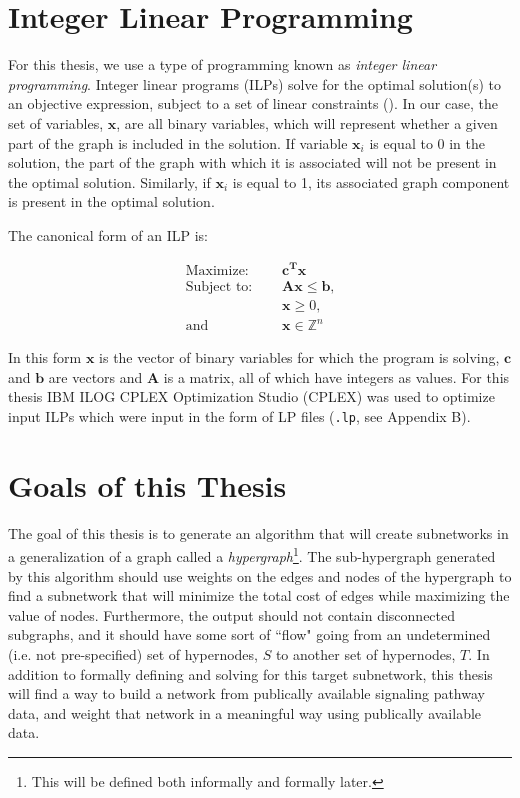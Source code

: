 \documentclass[12pt,twoside]{reedthesis}
\theoremstyle{definition}
\begin{document}
 \section{Integer Linear Programming}

  For this thesis, we use a type of programming known as \textit{integer linear programming}. Integer linear programs (ILPs) solve for the optimal solution(s) to an objective expression, subject to a set of linear constraints (\cite{Papadimitriou1998}). In our case, the set of variables, $\mathbf{x}$, are all binary variables, which will represent whether a given part of the graph is included in the solution. If variable $\mathbf{x}_i$ is equal to 0 in the solution, the part of the graph with which it is associated will not be present in the optimal solution. Similarly, if $\mathbf{x}_i$ is equal to 1, its associated graph component is present in the optimal solution.\par

  The canonical form of an ILP is:\par

  \begin{align}
    \text{Maximize: }\quad&\mathbf{c^Tx}\label{eq:obj_canonical}\\
    \text{Subject to: }\quad&\mathbf{Ax}\leq\mathbf{b}\text{,}\label{eq:constA}\\
    &\mathbf{x} \geq 0 \text{,}\label{eq:constB}\\
    \text{and } \quad & \mathbf{x} \in \mathbb{Z}^n \label{eq:constC}
  \end{align}

  In this form $\mathbf{x}$ is the vector of binary variables for which the program is solving, $\mathbf{c}$ and $\mathbf{b}$ are vectors and $\mathbf{A}$ is a matrix, all of which have integers as values. For this thesis IBM ILOG CPLEX Optimization Studio (CPLEX) was used to optimize input ILPs which were input in the form of LP files (\texttt{.lp}, see Appendix B).

 \section{Goals of this Thesis}

 The goal of this thesis is to generate an algorithm that will create subnetworks in a generalization of a graph called a \textit{hypergraph}\footnote{This will be defined both informally and formally later.}. The sub-hypergraph generated by this algorithm should use weights on the edges and nodes of the hypergraph to find a subnetwork that will minimize the total cost of edges while maximizing the value of nodes. Furthermore, the output should not contain disconnected subgraphs, and it should have some sort of ``flow" going from an undetermined (i.e. not pre-specified) set of hypernodes, $S$ to another set of hypernodes, $T$. In addition to formally defining and solving for this target subnetwork, this thesis will find a way to build a network from publically available signaling pathway data, and weight that network in a meaningful way using publically available data.\par
\end{document}
